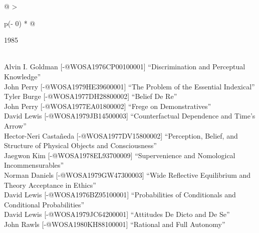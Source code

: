 \documentclass[
  10pt,
  letterpaper,
  DIV=11,
  numbers=noendperiod,
  twoside]{scrartcl}
\begin{document}
\begin{longtable}[]{@{}
  >{\raggedright\arraybackslash}p{(\columnwidth - 0\tabcolsep) * }@{}}

\caption{\label{tbl-top-ten-1976}Most cited articles published less than
ten years ago as of 1985.}

\tabularnewline

\toprule\noalign{}
\begin{minipage}[b]{\linewidth}\raggedright
1985
\end{minipage} \\
\midrule\noalign{}
\endhead
\bottomrule\noalign{}
\endlastfoot
Alvin I. Goldman {[}-@WOSA1976CP00100001{]} ``Discrimination and
Perceptual Knowledge'' \\
John Perry {[}-@WOSA1979HE39600001{]} ``The Problem of the Essential
Indexical'' \\
Tyler Burge {[}-@WOSA1977DH28800002{]} ``Belief De Re'' \\
John Perry {[}-@WOSA1977EA01800002{]} ``Frege on Demonstratives'' \\
David Lewis {[}-@WOSA1979JB14500003{]} ``Counterfactual Dependence and
Time's Arrow'' \\
Hector-Neri Castañeda {[}-@WOSA1977DV15800002{]} ``Perception, Belief,
and Structure of Physical Objects and Consciousness'' \\
Jaegwon Kim {[}-@WOSA1978EL93700009{]} ``Supervenience and Nomological
Incommensurables'' \\
Norman Daniels {[}-@WOSA1979GW47300003{]} ``Wide Reflective Equilibrium
and Theory Acceptance in Ethics'' \\
David Lewis {[}-@WOSA1976BZ95100001{]} ``Probabilities of Conditionals
and Conditional Probabilities'' \\
David Lewis {[}-@WOSA1979JC64200001{]} ``Attitudes De Dicto and De
Se'' \\
John Rawls {[}-@WOSA1980KH88100001{]} ``Rational and Full Autonomy'' \\

\end{longtable}
\end{document}
